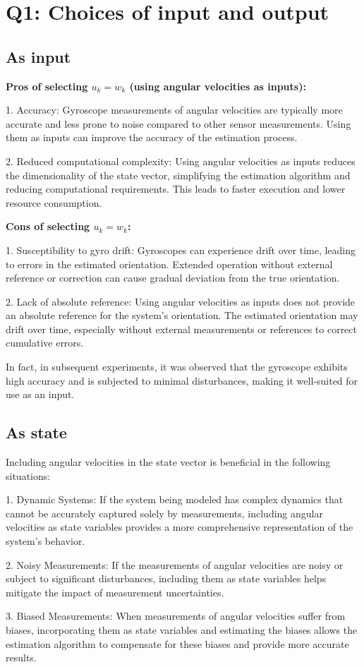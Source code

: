 \section{Q1: Choices of input and output}
\subsection{As input}

\textbf{Pros of selecting $u_k = w_k$ (using angular velocities as inputs):}

1. Accuracy: Gyroscope measurements of angular velocities are typically more accurate and less prone to noise compared to other sensor measurements. Using them as inputs can improve the accuracy of the estimation process.

2. Reduced computational complexity: Using angular velocities as inputs reduces the dimensionality of the state vector, simplifying the estimation algorithm and reducing computational requirements. This leads to faster execution and lower resource consumption.

\textbf{Cons of selecting $u_k = w_k$:}

1. Susceptibility to gyro drift: Gyroscopes can experience drift over time, leading to errors in the estimated orientation. Extended operation without external reference or correction can cause gradual deviation from the true orientation.

2. Lack of absolute reference: Using angular velocities as inputs does not provide an absolute reference for the system's orientation. The estimated orientation may drift over time, especially without external measurements or references to correct cumulative errors.

In fact, in subsequent experiments, it was observed that the gyroscope exhibits high accuracy and is subjected to minimal disturbances, making it well-suited for use as an input.

\subsection{As state}

Including angular velocities in the state vector is beneficial in the following situations:

1. Dynamic Systems: If the system being modeled has complex dynamics that cannot be accurately captured solely by measurements, including angular velocities as state variables provides a more comprehensive representation of the system's behavior.

2. Noisy Measurements: If the measurements of angular velocities are noisy or subject to significant disturbances, including them as state variables helps mitigate the impact of measurement uncertainties.

3. Biased Measurements: When measurements of angular velocities suffer from biases, incorporating them as state variables and estimating the biases allows the estimation algorithm to compensate for these biases and provide more accurate results.